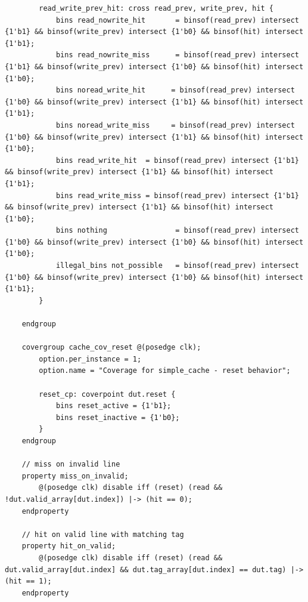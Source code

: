 \documentclass{article}
\begin{document}
\begin{verbatim}
        read_write_prev_hit: cross read_prev, write_prev, hit {
            bins read_nowrite_hit       = binsof(read_prev) intersect {1'b1} && binsof(write_prev) intersect {1'b0} && binsof(hit) intersect {1'b1};
            bins read_nowrite_miss      = binsof(read_prev) intersect {1'b1} && binsof(write_prev) intersect {1'b0} && binsof(hit) intersect {1'b0};
            bins noread_write_hit      = binsof(read_prev) intersect {1'b0} && binsof(write_prev) intersect {1'b1} && binsof(hit) intersect {1'b1};
            bins noread_write_miss     = binsof(read_prev) intersect {1'b0} && binsof(write_prev) intersect {1'b1} && binsof(hit) intersect {1'b0};
            bins read_write_hit  = binsof(read_prev) intersect {1'b1} && binsof(write_prev) intersect {1'b1} && binsof(hit) intersect {1'b1};
            bins read_write_miss = binsof(read_prev) intersect {1'b1} && binsof(write_prev) intersect {1'b1} && binsof(hit) intersect {1'b0};
            bins nothing                = binsof(read_prev) intersect {1'b0} && binsof(write_prev) intersect {1'b0} && binsof(hit) intersect {1'b0};
            illegal_bins not_possible   = binsof(read_prev) intersect {1'b0} && binsof(write_prev) intersect {1'b0} && binsof(hit) intersect {1'b1};
        }

    endgroup

    covergroup cache_cov_reset @(posedge clk);
        option.per_instance = 1;
        option.name = "Coverage for simple_cache - reset behavior";
        
        reset_cp: coverpoint dut.reset {
            bins reset_active = {1'b1};
            bins reset_inactive = {1'b0};
        }
    endgroup

    // miss on invalid line
    property miss_on_invalid;
        @(posedge clk) disable iff (reset) (read && !dut.valid_array[dut.index]) |-> (hit == 0);
    endproperty

    // hit on valid line with matching tag
    property hit_on_valid;
        @(posedge clk) disable iff (reset) (read && dut.valid_array[dut.index] && dut.tag_array[dut.index] == dut.tag) |-> (hit == 1);
    endproperty
\end{verbatim}
\end{document}
